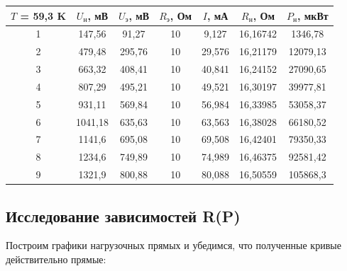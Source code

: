 \documentclass[a4paper, 12pt]{article} %
\begin{document}
\begin{center}
\begin{tabular}{|c|c|c|c|c|c|c|}
\hline
\textbf{$T$ = 59,3 K} & $U_\text{н}$, мВ & $U_\text{э}$, мВ & $R_\text{э}$, Ом & $I$, мА & $R_\text{н}$, Ом & $P_\text{н}$, мкВт \\ \hline
1                     & 147,56           & 91,27           & 10               & 9,127   & 16,16742         & 1346,78          \\ \hline
2                     & 479,48           & 295,76          & 10               & 29,576  & 16,21179         & 12079,13         \\ \hline
3                     & 663,32           & 408,41          & 10               & 40,841  & 16,24152         & 27090,65         \\ \hline
4                     & 807,29           & 495,21          & 10               & 49,521  & 16,30197         & 39977,81         \\ \hline
5                     & 931,11           & 569,84          & 10               & 56,984  & 16,33985         & 53058,37         \\ \hline
6                     & 1041,18          & 635,63          & 10               & 63,563  & 16,38028         & 66180,52         \\ \hline
7                     & 1141,6           & 695,08          & 10               & 69,508  & 16,42401         & 79350,33         \\ \hline
8                     & 1234,6           & 749,89          & 10               & 74,989  & 16,46375         & 92581,42         \\ \hline
9                     & 1321,9           & 800,88          & 10               & 80,088  & 16,50559         & 105868,3         \\ \hline
\end{tabular}
\end{center}

\subsection{Исследование зависимостей R(P)}

Построим графики нагрузочных прямых и убедимся, что полученные кривые действительно прямые:
\end{document}
